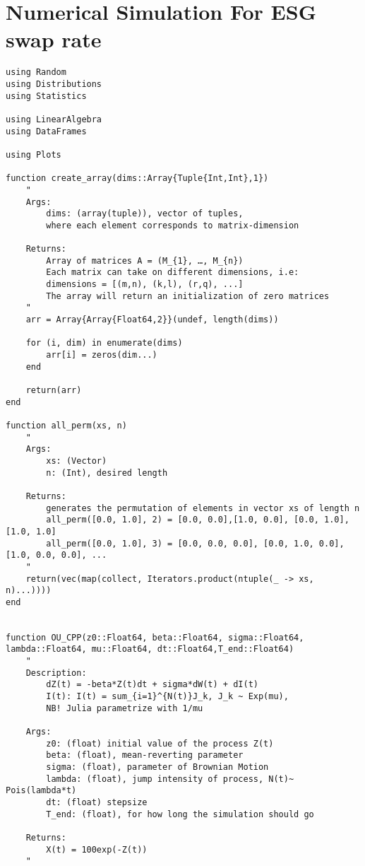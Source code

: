 \newpage 

\section{Numerical Simulation For ESG swap rate}

\begin{verbatim}
using Random 
using Distributions
using Statistics

using LinearAlgebra
using DataFrames

using Plots

function create_array(dims::Array{Tuple{Int,Int},1})
    "
    Args: 
        dims: (array(tuple)), vector of tuples, 
        where each element corresponds to matrix-dimension
    
    Returns:
        Array of matrices A = (M_{1}, …, M_{n})
        Each matrix can take on different dimensions, i.e:
        dimensions = [(m,n), (k,l), (r,q), ...] 
        The array will return an initialization of zero matrices  
    "
    arr = Array{Array{Float64,2}}(undef, length(dims))

    for (i, dim) in enumerate(dims)
        arr[i] = zeros(dim...)
    end

    return(arr)
end

function all_perm(xs, n)
    " 
    Args: 
        xs: (Vector)
        n: (Int), desired length
    
    Returns:
        generates the permutation of elements in vector xs of length n
        all_perm([0.0, 1.0], 2) = [0.0, 0.0],[1.0, 0.0], [0.0, 1.0], [1.0, 1.0]
        all_perm([0.0, 1.0], 3) = [0.0, 0.0, 0.0], [0.0, 1.0, 0.0], [1.0, 0.0, 0.0], ...
    "
    return(vec(map(collect, Iterators.product(ntuple(_ -> xs, n)...))))
end 


function OU_CPP(z0::Float64, beta::Float64, sigma::Float64, lambda::Float64, mu::Float64, dt::Float64,T_end::Float64)
    " 
    Description:
        dZ(t) = -beta*Z(t)dt + sigma*dW(t) + dI(t)
        I(t): I(t) = sum_{i=1}^{N(t)}J_k, J_k ~ Exp(mu), 
        NB! Julia parametrize with 1/mu

    Args:    
        z0: (float) initial value of the process Z(t)
        beta: (float), mean-reverting parameter
        sigma: (float), parameter of Brownian Motion
        lambda: (float), jump intensity of process, N(t)~ Pois(lambda*t) 
        dt: (float) stepsize 
        T_end: (float), for how long the simulation should go
     
    Returns: 
        X(t) = 100exp(-Z(t))
    "


\end{verbatim}
